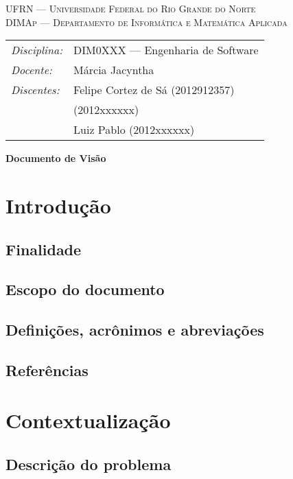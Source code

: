 \documentclass[12pt, a4paper]{article}
\begin{document}
    \begin{center}
      \textsc{UFRN --- Universidade Federal do Rio Grande do Norte} \\
      \textsc{DIMAp --- Departamento de Informática e Matemática Aplicada} \\
    \end{center}

    \bigskip

    \begin{tabular}{@{}ll@{}}
        \emph{Disciplina:} & DIM0XXX --- Engenharia de Software \\
        \emph{Docente:}    & Márcia Jacyntha \\
        \emph{Discentes:}  & Felipe Cortez de Sá \small{(2012912357)} \\
                           &  \small{(2012xxxxxx)}\\
                           & Luiz Pablo \small{(2012xxxxxx)}
    \end{tabular}

    \bigskip

    \begin{center}
      \Large\textbf{Documento de Visão}
    \end{center}

    \section{Introdução}
    \subsection{Finalidade}
    \subsection{Escopo do documento}
    \subsection{Definições, acrônimos e abreviações}
    \subsection{Referências}

    \section{Contextualização}
    \subsection{Descrição do problema}
\end{document}
